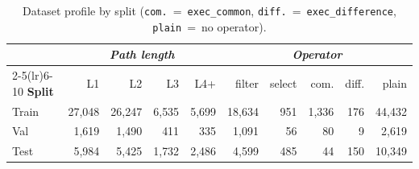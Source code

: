 \begin{table}[t]
\centering
\small
\setlength{\tabcolsep}{4pt}
\begin{tabular}{lrrrr|rrrrr}
\toprule
& \multicolumn{4}{c}{\textit{Path length}} & \multicolumn{5}{c}{\textit{Operator}} \\
\cmidrule(lr){2-5}\cmidrule(lr){6-10}
\textbf{Split} & L1 & L2 & L3 & L4+ & filter & select & com. & diff. & plain \\
\midrule
Train & 27{,}048 & 26{,}247 & 6{,}535 & 5{,}699 & 18{,}634 & 951 & 1{,}336 & 176 & 44{,}432 \\
Val   & 1{,}619  & 1{,}490  & 411    & 335    & 1{,}091  & 56  & 80    & 9   & 2{,}619 \\
Test  & 5{,}984  & 5{,}425  & 1{,}732 & 2{,}486 & 4{,}599  & 485 & 44    & 150 & 10{,}349 \\
\bottomrule
\end{tabular}
\caption{Dataset profile by split (\texttt{com.}~=~\texttt{exec\_common}, \texttt{diff.}~=~\texttt{exec\_difference}, \texttt{plain}~=~no operator).}
\label{tab:dataset_profile}
\end{table}
